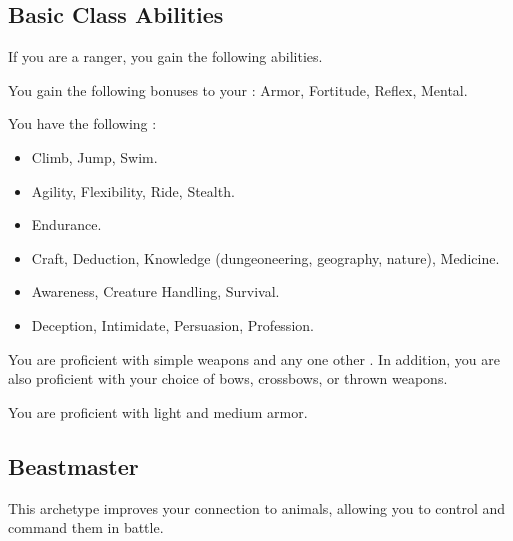     \subsection{Basic Class Abilities}
        If you are a ranger, you gain the following abilities.

        You gain the following bonuses to your :  Armor,  Fortitude,  Reflex,  Mental.

        You have the following :
        \begin{itemize}
            \item {} Climb, Jump, Swim.
            \item {} Agility, Flexibility, Ride, Stealth.
            \item {} Endurance.
            \item {} Craft, Deduction, Knowledge (dungeoneering, geography, nature), Medicine.
            \item {} Awareness, Creature Handling, Survival.
            \item {} Deception, Intimidate, Persuasion, Profession.
        \end{itemize}

        You are proficient with simple weapons and any one other .
        In addition, you are also proficient with your choice of bows, crossbows, or thrown weapons.

        You are proficient with light and medium armor.

    \subsection{Beastmaster}
        This archetype improves your connection to animals, allowing you to control and command them in battle.

